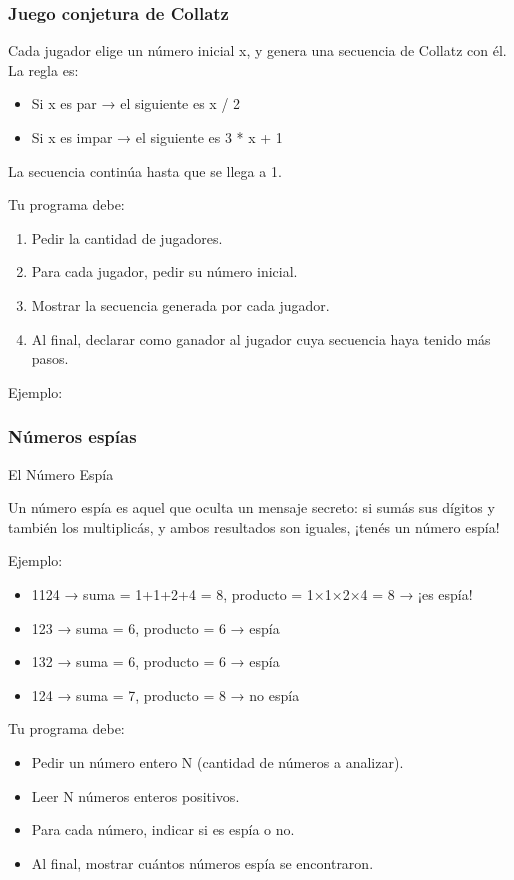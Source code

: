 \subsubsection{Juego conjetura de Collatz}
Cada jugador elige un número inicial x, y genera una secuencia de Collatz con él.
La regla es:

\begin{itemize}
  \item Si x es par → el siguiente es x / 2
  \item Si x es impar → el siguiente es 3 * x + 1
\end{itemize}

La secuencia continúa hasta que se llega a 1.

Tu programa debe:

\begin{enumerate}
  \item Pedir la cantidad de jugadores.
  \item Para cada jugador, pedir su número inicial.
  \item Mostrar la secuencia generada por cada jugador.
  \item Al final, declarar como ganador al jugador cuya secuencia haya tenido más pasos.
\end{enumerate}

Ejemplo:

{\small
  \lstset{inputencoding=utf8/latin1}
  
}

\subsubsection{Números espías}
El Número Espía

Un número espía es aquel que oculta un mensaje secreto: si sumás sus dígitos y también los multiplicás, y ambos resultados son iguales, ¡tenés un número espía!

Ejemplo:

\begin{itemize}
  \item 1124 → suma = 1+1+2+4 = 8, producto = 1×1×2×4 = 8 → ¡es espía!
  \item 123 → suma = 6, producto = 6 → espía
  \item 132 → suma = 6, producto = 6 → espía
  \item 124 → suma = 7, producto = 8 → no espía
\end{itemize}

Tu programa debe:
\begin{itemize}
  \item Pedir un número entero N (cantidad de números a analizar).
  \item Leer N números enteros positivos.
  \item Para cada número, indicar si es espía o no.
  \item Al final, mostrar cuántos números espía se encontraron.
\end{itemize}

